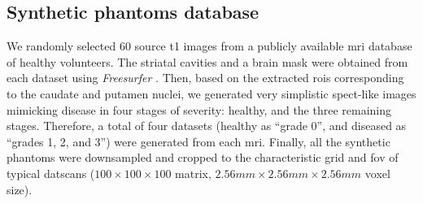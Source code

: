 \documentclass{frontiers}
\begin{document}
\subsection{Synthetic phantoms database} %
\label{sec:data_synthetic}
We randomly selected 60 source \gls*{t1} images from a publicly available
  \gls*{mri} database \citep{hill_ixi_2006} of healthy volunteers.
The striatal cavities and a brain mask were obtained from each dataset
  using \emph{Freesurfer} \citep{fischl_freesurfer_2012}.
Then, based on the extracted \glspl*{roi} corresponding to the caudate and putamen
  nuclei,  we generated very simplistic \gls*{spect}-like images mimicking disease in
  four stages of severity: healthy, and the three remaining stages.
  Therefore, a total of four datasets (healthy as ``grade 0'',
  and diseased as ``grades 1, 2, and 3'') were generated from each \gls*{mri}.
Finally, all the synthetic phantoms were downsampled and cropped to the characteristic
  grid and \acrlong*{fov} of typical \glspl*{datscan} ($100\times100\times100$ matrix,
  $2.56mm\times2.56mm\times2.56mm$ voxel size).
\end{document}
